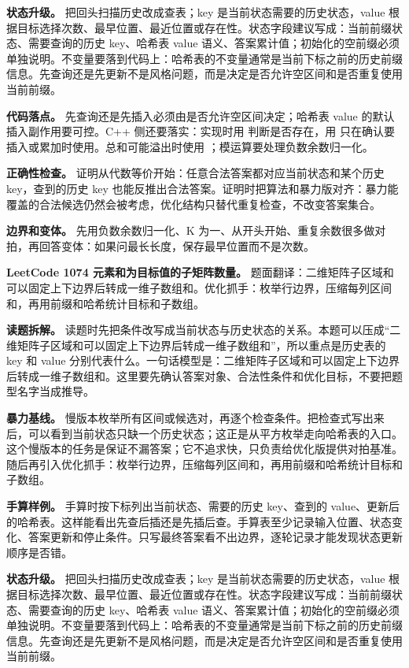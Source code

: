 \textbf{状态升级。} 把回头扫描历史改成查表；key 是当前状态需要的历史状态，value 根据目标选择次数、最早位置、最近位置或存在性。状态字段建议写成：当前前缀状态、需要查询的历史 key、哈希表 value 语义、答案累计值；初始化的空前缀必须单独说明。不变量要落到代码上：哈希表的不变量通常是当前下标之前的历史前缀信息。先查询还是先更新不是风格问题，而是决定是否允许空区间和是否重复使用当前前缀。

\textbf{代码落点。} 先查询还是先插入必须由是否允许空区间决定；哈希表 value 的默认插入副作用要可控。C++ 侧还要落实：实现时用  判断是否存在，用  只在确认要插入或累加时使用。总和可能溢出时使用 ；模运算要处理负数余数归一化。

\textbf{正确性检查。} 证明从代数等价开始：任意合法答案都对应当前状态和某个历史 key，查到的历史 key 也能反推出合法答案。证明时把算法和暴力版对齐：暴力能覆盖的合法候选仍然会被考虑，优化结构只替代重复检查，不改变答案集合。

\textbf{边界和变体。} 先用负数余数归一化、K 为一、从开头开始、重复余数很多做对拍，再回答变体：如果问最长长度，保存最早位置而不是次数。

\noindent\textbf{LeetCode 1074 元素和为目标值的子矩阵数量。} 题面翻译：二维矩阵子区域和可以固定上下边界后转成一维子数组和。优化抓手：枚举行边界，压缩每列区间和，再用前缀和哈希统计目标和子数组。

\textbf{读题拆解。} 读题时先把条件改写成当前状态与历史状态的关系。本题可以压成“二维矩阵子区域和可以固定上下边界后转成一维子数组和”，所以重点是历史表的 key 和 value 分别代表什么。一句话模型是：二维矩阵子区域和可以固定上下边界后转成一维子数组和。这里要先确认答案对象、合法性条件和优化目标，不要把题型名字当成推导。

\textbf{暴力基线。} 慢版本枚举所有区间或候选对，再逐个检查条件。把检查式写出来后，可以看到当前状态只缺一个历史状态；这正是从平方枚举走向哈希表的入口。这个慢版本的任务是保证不漏答案；它不追求快，只负责给优化版提供对拍基准。随后再引入优化抓手：枚举行边界，压缩每列区间和，再用前缀和哈希统计目标和子数组。

\textbf{手算样例。} 手算时按下标列出当前状态、需要的历史 key、查到的 value、更新后的哈希表。这样能看出先查后插还是先插后查。手算表至少记录输入位置、状态变化、答案更新和停止条件。只写最终答案看不出边界，逐轮记录才能发现状态更新顺序是否错。

\textbf{状态升级。} 把回头扫描历史改成查表；key 是当前状态需要的历史状态，value 根据目标选择次数、最早位置、最近位置或存在性。状态字段建议写成：当前前缀状态、需要查询的历史 key、哈希表 value 语义、答案累计值；初始化的空前缀必须单独说明。不变量要落到代码上：哈希表的不变量通常是当前下标之前的历史前缀信息。先查询还是先更新不是风格问题，而是决定是否允许空区间和是否重复使用当前前缀。

